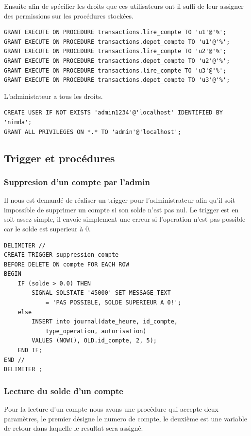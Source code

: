 \documentclass[paper=a4, fontsize=11pt]{scrartcl} %
\numberwithin{equation}{section} %
\numberwithin{figure}{section} %
\numberwithin{table}{section} %
\begin{document}
Ensuite afin de spécifier les droits que ces utilisateurs ont il suffi de leur assigner des permissions sur les procédures stockées.
\begin{lstlisting}
GRANT EXECUTE ON PROCEDURE transactions.lire_compte TO 'u1'@'%';
GRANT EXECUTE ON PROCEDURE transactions.depot_compte TO 'u1'@'%';
GRANT EXECUTE ON PROCEDURE transactions.lire_compte TO 'u2'@'%';
GRANT EXECUTE ON PROCEDURE transactions.depot_compte TO 'u2'@'%';
GRANT EXECUTE ON PROCEDURE transactions.lire_compte TO 'u3'@'%';
GRANT EXECUTE ON PROCEDURE transactions.depot_compte TO 'u3'@'%';
\end{lstlisting}

L'administateur a tous les droits.
\begin{lstlisting}
CREATE USER IF NOT EXISTS 'admin1234'@'localhost' IDENTIFIED BY 'nimda';
GRANT ALL PRIVILEGES ON *.* TO 'admin'@'localhost';
\end{lstlisting}


\subsection{Trigger et procédures}
\subsubsection{Suppresion d'un compte par l'admin}

Il nous est demandé de réaliser un trigger pour l'administrateur afin qu'il soit impossible de supprimer un compte si son solde n'est pas nul. Le trigger est en soit assez simple, il envoie simplement une erreur si l'operation n'est pas possible car le solde est superieur à 0.


\begin{lstlisting}
DELIMITER //
CREATE TRIGGER suppression_compte
BEFORE DELETE ON compte FOR EACH ROW
BEGIN
	IF (solde > 0.0) THEN
		SIGNAL SQLSTATE '45000' SET MESSAGE_TEXT 
			= 'PAS POSSIBLE, SOLDE SUPERIEUR A 0!';
	else
		INSERT into journal(date_heure, id_compte, 
			type_operation, autorisation)
        VALUES (NOW(), OLD.id_compte, 2, 5);
	END IF;
END //
DELIMITER ;
\end{lstlisting}


\subsubsection{Lecture du solde d'un compte}
Pour la lecture d'un compte nous avons une procédure qui accepte deux paramètres, le premier désigne le numero de compte, le deuxième est une variable de retour dans laquelle le resultat sera assigné.
\end{document}
